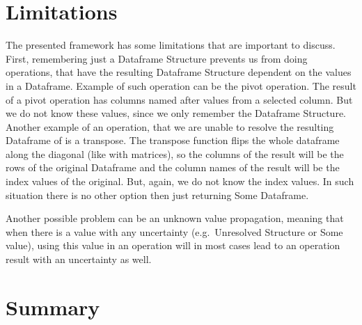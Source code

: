 \section{Limitations}

The presented framework has some limitations that are important to discuss.
First, remembering just a Dataframe Structure prevents us from doing operations, that have the resulting Dataframe
Structure dependent on the values in a Dataframe.
Example of such operation can be the pivot operation.
The result of a pivot operation has columns named after values from a selected column.
But we do not know these values, since we only remember the Dataframe Structure.
Another example of an operation, that we are unable to resolve the resulting Dataframe of is a transpose.
The transpose function flips the whole dataframe along the diagonal (like with matrices), so the columns of the result
will be the rows of the original Dataframe and the column names of the result will be the index values of the original.
But, again, we do not know the index values.
In such situation there is no other option then just returning Some Dataframe.

Another possible problem can be an unknown value propagation, meaning that when there is a value with any uncertainty
(e.g.\ Unresolved Structure or Some value), using this value in an operation will in most cases lead to an operation
result with an uncertainty as well.


\section*{Summary}

